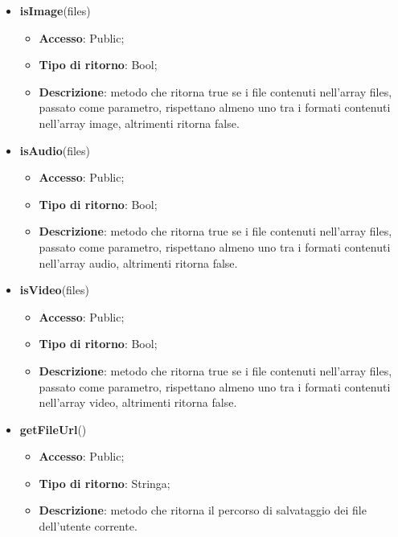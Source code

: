 {\begin{itemize}
\begin{itemize}
				\item \textbf{Tipo di ritorno}: Void;
				\item \textbf{Descrizione}: metodo che richiama Model::\-serverRelation::\-?????????????????????????????????????????????????????????????????????????????????? effettuando l'upload dei file contenuti nell'array files passato come parametro. Se l'operazione ha successo viene invocato success altrimenti error.
			\end{itemize}
			\item \textbf{isImage}(files)
			\begin{itemize}
				\item \textbf{Accesso}: Public;
				\item \textbf{Tipo di ritorno}: Bool;
				\item \textbf{Descrizione}: metodo che ritorna true se i file contenuti nell'array files, passato come parametro, rispettano almeno uno tra i formati contenuti nell'array image, altrimenti ritorna false.
			\end{itemize}
			\item \textbf{isAudio}(files)
			\begin{itemize}
				\item \textbf{Accesso}: Public;
				\item \textbf{Tipo di ritorno}: Bool;
				\item \textbf{Descrizione}: metodo che ritorna true se i file contenuti nell'array files, passato come parametro, rispettano almeno uno tra i formati contenuti nell'array audio, altrimenti ritorna false.
			\end{itemize}
			\item \textbf{isVideo}(files)
			\begin{itemize}
				\item \textbf{Accesso}: Public;
				\item \textbf{Tipo di ritorno}: Bool;
				\item \textbf{Descrizione}: metodo che ritorna true se i file contenuti nell'array files, passato come parametro, rispettano almeno uno tra i formati contenuti nell'array video, altrimenti ritorna false.
			\end{itemize}
			\item \textbf{getFileUrl}()
			\begin{itemize}
				\item \textbf{Accesso}: Public;
				\item \textbf{Tipo di ritorno}: Stringa;
				\item \textbf{Descrizione}: metodo che ritorna il percorso di salvataggio dei file dell'utente corrente.
			\end{itemize}
		\end{itemize} 
}

